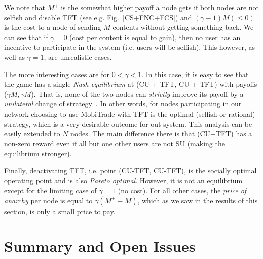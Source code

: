 We note that $M^{+}$ is the somewhat higher payoff a node gets if both nodes are not selfish and disable TFT (see e.g. Fig.~\ref{CS+FNC+FCS}) and $(\gamma - 1)M (\le 0)$ is the cost to a node of sending $M$ contents without getting something back. We can see that if $\gamma = 0$ (cost per content is equal to gain), then no user has an incentive to participate in the system (i.e. users will be selfish). This however, as well as $\gamma = 1$, are unrealistic cases.

The more interesting cases are for $0 < \gamma < 1$. In this case, it is easy to see that the game has a single \emph{Nash equilibrium} at (CU + TFT, CU + TFT) with payoffs ($\gamma M, \gamma M$). That is, none of the two nodes can \emph{strictly} improve its payoff by a \emph{unilateral} change of strategy~\cite{game}. In other words, for nodes participating in our network choosing to use MobiTrade with TFT is the optimal (selfish or rational) strategy, which is a very desirable outcome for out system. This analysis can be easily extended to $N$ nodes. The main difference there is that (CU+TFT) has a non-zero reward even if all but one other users are not SU (making the equilibrium stronger).

Finally, deactivating TFT, i.e. point (CU-TFT, CU-TFT), is the socially optimal operating point and is also \emph{Pareto optimal}. However, it is not an equilibrium except for the limiting case of $\gamma = 1$ (no cost). For all other cases, the \emph{price of anarchy} per node is equal to $\gamma (M^{+} - M)$, which as we saw in the results of this section, is only a small price to pay.

\section{Summary and Open Issues}